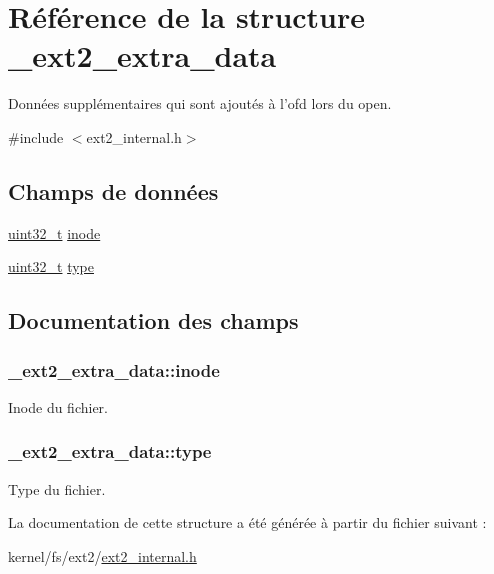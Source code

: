 \hypertarget{struct__ext2__extra__data}{\section{Référence de la structure \-\_\-ext2\-\_\-extra\-\_\-data}
\label{struct__ext2__extra__data}
}


Données supplémentaires qui sont ajoutés à l'ofd lors du open.  




{\ttfamily \#include $<$ext2\-\_\-internal.\-h$>$}

\subsection*{Champs de données}
\begin{DoxyCompactItemize}
\item 
\hyperlink{types_8h_a33594304e786b158f3fb30289278f5af}{uint32\-\_\-t} \hyperlink{struct__ext2__extra__data_a67635cdfceeb4475b1410ec3bc8ae552}{inode}
\item 
\hyperlink{types_8h_a33594304e786b158f3fb30289278f5af}{uint32\-\_\-t} \hyperlink{struct__ext2__extra__data_a607854c0e8d75ee5be59b7e67eb2a00c}{type}
\end{DoxyCompactItemize}


\subsection{Documentation des champs}
\hypertarget{struct__ext2__extra__data_a67635cdfceeb4475b1410ec3bc8ae552}{
\subsubsection[{inode}]{ \-\_\-ext2\-\_\-extra\-\_\-data\-::inode}}\label{struct__ext2__extra__data_a67635cdfceeb4475b1410ec3bc8ae552}
Inode du fichier. \hypertarget{struct__ext2__extra__data_a607854c0e8d75ee5be59b7e67eb2a00c}{
\subsubsection[{type}]{ \-\_\-ext2\-\_\-extra\-\_\-data\-::type}}\label{struct__ext2__extra__data_a607854c0e8d75ee5be59b7e67eb2a00c}
Type du fichier. 

La documentation de cette structure a été générée à partir du fichier suivant \-:\begin{DoxyCompactItemize}
\item 
kernel/fs/ext2/\hyperlink{ext2__internal_8h}{ext2\-\_\-internal.\-h}\end{DoxyCompactItemize}
